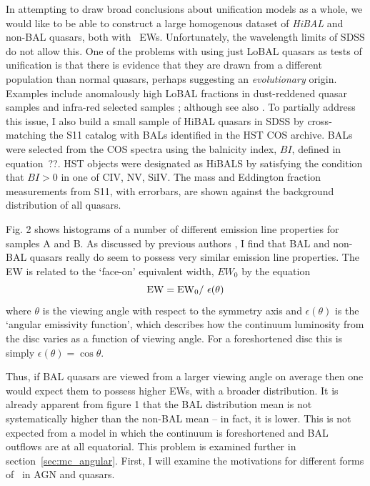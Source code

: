 In attempting to draw broad conclusions about unification models as a whole,
we would like to be able to construct a large homogenous dataset of 
{\em HiBAL} and non-BAL quasars, both with \oiiifull\ EWs. Unfortunately,
the wavelength limits of SDSS do not allow this. One of the problems with
using just LoBAL quasars as tests of unification is that there is evidence 
that they are drawn from a different population than normal quasars, perhaps
suggesting an {\em evolutionary} origin. Examples include anomalously 
high LoBAL fractions in dust-reddened quasar samples \citep{urrutia2009} 
and infra-red selected samples \citep{dai2012}; 
although see also \cite{lazarova2012}.
To partially address this issue, I also build a small sample 
of HiBAL quasars in SDSS by cross-matching the S11 catalog with 
BALs identified in the HST COS archive.
BALs were selected from the COS spectra using the balnicity index, 
$BI$, defined in equation~??. HST objects were designated as HiBALS 
by satisfying the condition that $BI>0$ in one of CIV, NV, SiIV.
The mass and Eddington fraction measurements from S11, with 
errorbars, are shown against the background distribution of all quasars.

Fig. 2 shows histograms of a number of different 
emission line properties for samples A and B. 
As discussed by previous authors \cite[e.g.][]{weymann1991}, I find that BAL
and non-BAL quasars really do seem to possess very similar emission line 
properties. The EW is related to the `face-on' equivalent width,
$EW_0$ by the equation
\begin{equation}
{\rm EW} = {\rm EW}_0 /~\epsilon(\theta)
\end{equation}
where $\theta$ is the viewing angle with respect to the symmetry axis 
and $\epsilon(\theta)$ is the `angular emissivity function', which describes 
how the continuum luminosity from the disc varies as a function of viewing angle.
For a foreshortened disc this is simply $\epsilon(\theta) = \cos \theta$.

Thus, if BAL quasars are viewed from a larger viewing angle on average then one
would expect them to possess higher EWs, with a broader distribution.
It is already apparent from figure 1 that the BAL distribution mean 
is not systematically higher than the non-BAL
mean -- in fact, it is lower. This is not expected from a model
in which the continuum is foreshortened and BAL outflows are at all equatorial.
This problem is examined further in section~\ref{sec:mc_angular}. 
First, I will examine the motivations for different forms of \ept\ 
in AGN and quasars.

